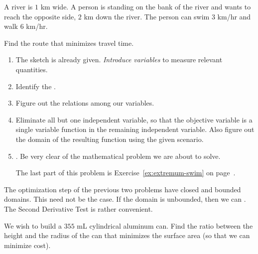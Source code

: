 \documentclass[../main.tex]{subfiles}
\begin{document}
\begin{example} \label{ex:optimization-swim}
  A  river is \(1\) km wide. A person is standing on the bank of the river and wants to reach the opposite side, \(2\) km down the river.  The person can swim \(3\) km/hr and walk \(6\) km/hr.

  Find the route that minimizes travel time.

  \hfill{}
  

  \begin{enumerate}[wide, noitemsep, label=(Step~\arabic*).]
    \item The sketch is already given. \emph{Introduce variables} to measure relevant quantities.


    \item Identify the .


    \item Figure out the relations among our variables.

       \clearpage

    \item Eliminate all but one independent variable, so that the objective variable is a single variable function in the remaining independent variable. Also figure out the domain of the resulting function using the given scenario.



    \item {}. Be very clear of the mathematical problem we are about to solve. 


      \blanks*

      {\footnotesize The last part of this problem is Exercise~\ref{ex:extremum-swim} on page~\pageref{ex:extremum-swim}.}
  \end{enumerate}
\end{example}
\clearpage

The optimization step of the previous two problems have closed and bounded domains. This need not be the case. If the domain is unbounded, then we can . The Second Derivative Test is rather convenient.

\begin{exercise} \label{ex:optimization-can}
  We wish to build a \(355\) mL cylindrical aluminum can.  Find the ratio between the height and the radius of the can that minimizes the surface area (so that we can minimize cost).

  \blanks*
  \clearpage
  
  \phantom{top}
  \blanks*
\end{exercise}
\clearpage
\end{document}
